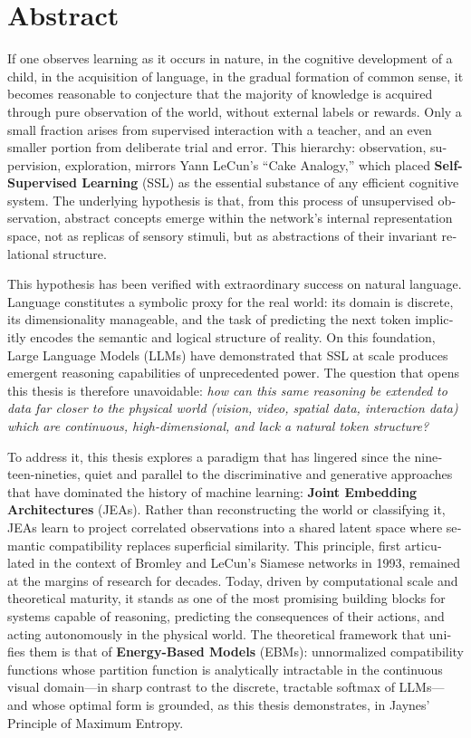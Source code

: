 \documentclass[12pt, oneside, openany]{book}
\begin{document}
\chapter*{Abstract}
\begin{otherlanguage}{english}
If one observes learning as it occurs in nature, in the cognitive development of a child, in the acquisition of language, in the gradual formation of common sense, it becomes reasonable to conjecture that the majority of knowledge is acquired through pure observation of the world, without external labels or rewards. Only a small fraction arises from supervised interaction with a teacher, and an even smaller portion from deliberate trial and error. This hierarchy: observation, supervision, exploration, mirrors Yann LeCun's ``Cake Analogy,'' which placed \textbf{Self-Supervised Learning} (SSL) as the essential substance of any efficient cognitive system. The underlying hypothesis is that, from this process of unsupervised observation, abstract concepts emerge within the network's internal representation space, not as replicas of sensory stimuli, but as abstractions of their invariant relational structure.

This hypothesis has been verified with extraordinary success on natural language. Language constitutes a symbolic proxy for the real world: its domain is discrete, its dimensionality manageable, and the task of predicting the next token implicitly encodes the semantic and logical structure of reality. On this foundation, Large Language Models (LLMs) have demonstrated that SSL at scale produces emergent reasoning capabilities of unprecedented power. The question that opens this thesis is therefore unavoidable: \textit{how can this same reasoning be extended to data far closer to the physical world (vision, video, spatial data, interaction data) which are continuous, high-dimensional, and lack a natural token structure?}

To address it, this thesis explores a paradigm that has lingered since the nineteen-nineties, quiet and parallel to the discriminative and generative approaches that have dominated the history of machine learning: \textbf{Joint Embedding Architectures} (JEAs). Rather than reconstructing the world or classifying it, JEAs learn to project correlated observations into a shared latent space where semantic compatibility replaces superficial similarity. This principle, first articulated in the context of Bromley and LeCun's Siamese networks in 1993, remained at the margins of research for decades. Today, driven by computational scale and theoretical maturity, it stands as one of the most promising building blocks for systems capable of reasoning, predicting the consequences of their actions, and acting autonomously in the physical world. The theoretical framework that unifies them is that of \textbf{Energy-Based Models} (EBMs): unnormalized compatibility functions whose partition function is analytically intractable in the continuous visual domain---in sharp contrast to the discrete, tractable softmax of LLMs---and whose optimal form is grounded, as this thesis demonstrates, in Jaynes' Principle of Maximum Entropy.


\end{otherlanguage}
\end{document}
